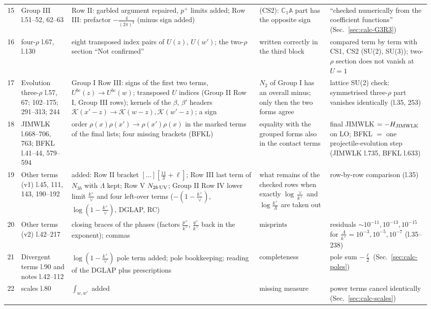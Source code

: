 \documentclass[10pt]{article}
\def\mf#1{\mathbb{#1}}
\begin{document}
{\begin{longtable}{@{}p{0.4cm}p{2.7cm}p{5.0cm}p{4.0cm}p{4.0cm}@{}}
15 & Group III l.51--52, 62--63 & Row II: garbled argument repaired, $p^{+}$ limits added; Row III: prefactor $-\frac{4}{(2\pi)^{3}}$ (minus sign added) & (CS2): $\mf{C}_{1}\mf{A}$ part has the opposite sign & ``checked numerically from the coefficient functions'' (Sec.~\ref{sec:calc-G3R3})\\
16 & four-$\rho$ l.67, l.130 & eight transposed index pairs of $U(z)$, $U(w')$; the two-$\rho$ section ``Not confirmed'' & written correctly in the third block & compared term by term with CS1, CS2 (SU(2), SU(3)); two-$\rho$ section does not vanish at $U=1$\\
17 & Evolution three-$\rho$ l.57, 67; 102--175; 291--313; 244 & Group I Row III: signs of the first two terms, $U^{bc}(z)\to U^{bc}(w)$; transposed $U$ indices (Group II Row I, Group III rows); kernels of the $\beta$, $\beta'$ headers $\mathcal{K}(x'-z)\to\mathcal{K}(w-z),\mathcal{K}(w'-z)$; a sign & $N_{2}$ of Group I has an overall minus; only then the two forms agree & lattice SU(2) check: symmetrised three-$\rho$ part vanishes identically (l.35, 253)\\
18 & JIMWLK l.668--706, 763; BFKL l.41--44, 579--594 & order $\rho(x)\rho(x')\to\rho(x')\rho(x)$ in the marked terms of the final lists; four missing brackets (BFKL) & equality with the grouped forms also in the contact terms & final JIMWLK $=-H_{\rm JIMWLK}$ on LO; BFKL $=$ one projectile-evolution step (JIMWLK l.735, BFKL l.633)\\
19 & Other terms (v1) l.45, 111, 143, 190--192 & added: Row II bracket $[\dots][\frac{11}{3}+\ell]$; Row III last term of $N_{3b}$ with $\Lambda$ kept; Row V $N_{2b\,\rm UV}$; Group II Row IV lower limit $\frac{k^{+}}{\vee}$ and four left-over terms ($-(1-\frac{k^{+}}{\vee})$, $\log(1-\frac{k^{+}}{\vee})$, DGLAP, RC) & what remains of the checked rows when exactly $\log\frac{\vee}{k^{+}}$ and $\log\frac{k^{+}}{\Lambda}$ are taken out & row-by-row comparison (l.35)\\
20 & Other terms (v2) l.42--217 & closing braces of the phases (factors $\frac{p^{+}}{k^{+}}$, $\frac{q^{+}}{k^{+}}$ back in the exponent); commas & misprints & residuals $\sim10^{-11},10^{-13},10^{-15}$ for $\frac{\Lambda}{k^{+}}=10^{-3},10^{-5},10^{-7}$ (l.35--238)\\
21 & Divergent terms l.90 and notes l.42--112 & $\log(1-\frac{k^{+}}{\vee})$ pole term added; pole bookkeeping; reading of the DGLAP plus prescriptions & completeness & pole sum $-\frac{\ell}{2}$ (Sec.~\ref{sec:calc-poles})\\
22 & scales l.80 & $\int_{w,w'}$ added & missing measure & power terms cancel identically (Sec.~\ref{sec:calc-scales})\\

\end{longtable}}
\end{document}
